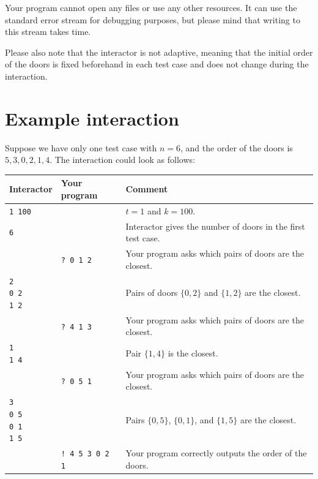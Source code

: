 Your program cannot open any files or use any other resources. It can use the standard
error stream for debugging purposes, but please mind that writing to this
stream takes time.

Please also note that the interactor is not adaptive, meaning that the initial order of the doors
is fixed beforehand in each test case and does not change during the interaction.

\section*{Example interaction}
Suppose we have only one test case with $n=6$, and the order of the doors is $5, 3, 0, 2, 1, 4$.
The interaction could look as follows:

\begin{center}
\begin{tabular}{|l|l|l|}
\hline
\textbf{Interactor} & \textbf{Your program} & \textbf{Comment} \\
\hline
\texttt{1 100} & & $t=1$ and $k=100$. \\ \hline
\texttt{6} & & Interactor gives the number of doors in the first test case. \\ \hline
& \texttt{? 0 1 2} & Your program asks which pairs of doors are the closest. \\ \hline
\shortstack{\texttt{2} \\ \texttt{0 2} \\ \texttt{1 2}} & & Pairs of doors $\{0,2\}$ and $\{1,2\}$ are the closest. \\ \hline
& \texttt{? 4 1 3} & Your program asks which pairs of doors are the closest. \\ \hline
\shortstack{\texttt{1} \\ \texttt{1 4}} & & Pair $\{1,4\}$ is the closest. \\ \hline
& \texttt{? 0 5 1} & Your program asks which pairs of doors are the closest. \\ \hline
\shortstack{\texttt{3} \\ \texttt{0 5} \\ \texttt{0 1} \\ \texttt{1 5}} & & Pairs $\{0,5\}$, $\{0,1\}$, and $\{1,5\}$ are the closest. \\ \hline
& \texttt{! 4 5 3 0 2 1} & Your program correctly outputs the order of the doors. \\ \hline
\end{tabular}
\end{center}


